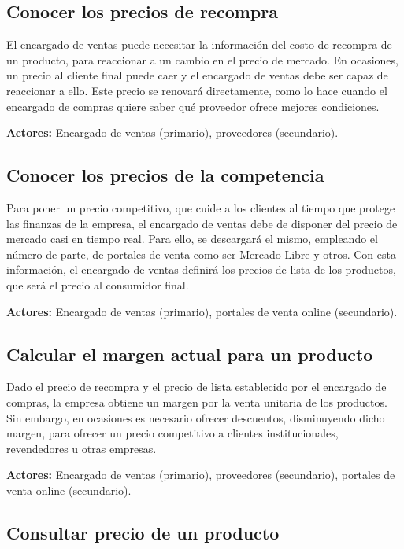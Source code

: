 \subsection{Conocer los precios de recompra}

El encargado de ventas puede necesitar la información del costo de recompra de un producto,
para reaccionar a un cambio en el precio de mercado.
En ocasiones, un precio al cliente final puede caer y el encargado de ventas debe ser capaz de reaccionar a ello.
Este precio se renovará directamente, 
como lo hace cuando el encargado de compras quiere saber qué proveedor ofrece mejores condiciones.

\textbf{Actores:} Encargado de ventas (primario), proveedores (secundario).

\subsection{Conocer los precios de la competencia}

Para poner un precio competitivo,
que cuide a los clientes al tiempo que protege las finanzas de la empresa,
el encargado de ventas debe de disponer del precio de mercado casi en tiempo real.
Para ello, se descargará el mismo, empleando el número de parte,
de portales de venta como ser Mercado Libre y otros.
Con esta información, 
el encargado de ventas definirá los precios de lista de los productos,
que será el precio al consumidor final.

\textbf{Actores:} Encargado de ventas (primario), portales de venta online (secundario).

\subsection{Calcular el margen actual para un producto}

Dado el precio de recompra y el precio de lista establecido por el encargado de compras,
la empresa obtiene un margen por la venta unitaria de los productos.
Sin embargo,
en ocasiones es necesario ofrecer descuentos, disminuyendo dicho margen,
para ofrecer un precio competitivo a clientes institucionales, revendedores u otras empresas.

\textbf{Actores:} Encargado de ventas (primario), proveedores (secundario), portales de venta online (secundario).

\subsection{Consultar precio de un producto}

